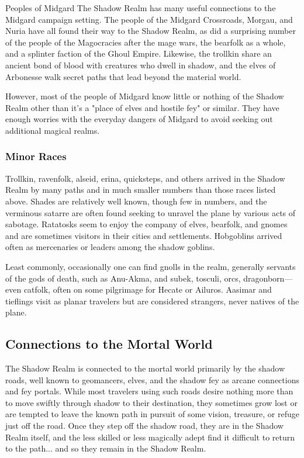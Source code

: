 \documentclass[10pt,a4paper,twoside,bg=print,twocolumn,openany,nodeprecatedcode]{dndbook}
\begin{document}
\begin{DndSidebar}[float=!b]{Peoples of Midgard}
The Shadow Realm has many useful connections to the Midgard campaign setting. The people of the Midgard Crossroads, Morgau, and Nuria have all found their way to the Shadow Realm, as did a surprising number of the people of the Magocracies after the mage wars, the bearfolk as a whole, and a splinter faction of the Ghoul Empire. Likewise, the trollkin share an ancient bond of blood with creatures who dwell in shadow, and the elves of Arbonesse walk secret paths that lead beyond the material world.



However, most of the people of Midgard know little or nothing of the Shadow Realm other than it's a "place of elves and hostile fey" or similar. They have enough worries with the everyday dangers of Midgard to avoid seeking out additional magical realms.



\end{DndSidebar}

\subsubsection{Minor Races}
Trollkin, ravenfolk, alseid, erina, quicksteps, and others arrived in the Shadow Realm by many paths and in much smaller numbers than those races listed above. Shades are relatively well known, though few in numbers, and the verminous satarre are often found seeking to unravel the plane by various acts of sabotage. Ratatosks seem to enjoy the company of elves, bearfolk, and gnomes and are sometimes visitors in their cities and settlements. Hobgoblins arrived often as mercenaries or leaders among the shadow goblins.

Least commonly, occasionally one can find gnolls in the realm, generally servants of the gods of death, such as Anu-Akma, and subek, tosculi, orcs, dragonborn—even catfolk, often on some pilgrimage for Hecate or Ailuros. Aasimar and tieflings visit as planar travelers but are considered strangers, never natives of the plane.

\subsection{Connections to the Mortal World}
The Shadow Realm is connected to the mortal world primarily by the shadow roads, well known to geomancers, elves, and the shadow fey as arcane connections and fey portals. While most travelers using such roads desire nothing more than to move swiftly through shadow to their destination, they sometimes grow lost or are tempted to leave the known path in pursuit of some vision, treasure, or refuge just off the road. Once they step off the shadow road, they are in the Shadow Realm itself, and the less skilled or less magically adept find it difficult to return to the path... and so they remain in the Shadow Realm.
\end{document}
